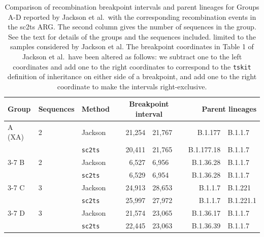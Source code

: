 \documentclass[12pt]{article}
\begin{document}
\begin{table}
\centering
\caption{
Comparison of recombination breakpoint
intervals and parent lineages for Groups A-D
reported by Jackson et al.\ with the corresponding
recombination events in the sc2ts ARG.
The second column gives the number of sequences in the group.
See the text for details of the groups and the sequences included.
limited to the samples considered by Jackson et al.
The breakpoint coordinates in Table 1 of Jackson et al.\ have been altered as follows:
we subtract one to the left coordinates and add one to the right coordinates
to correspond to the \texttt{tskit} definition of inheritance on either side of a breakpoint,
and add one to the right coordinate to make the intervals right-exclusive.
}
\label{tab:jackson}
\begin{tabular}{lllr@{--}lr@{+}l}
\toprule
Group & Sequences & Method & \multicolumn{2}{c}{Breakpoint interval} & \multicolumn{2}{r}{Parent lineages} \\
\midrule
A (XA)       & 2   & Jackson        &  21,254&21,767 & B.1.177&B.1.1.7 \\
             &     &\texttt{sc2ts} &  20,411&21,765 & B.1.177.18&B.1.1.7 \\
\cmidrule{3-7}
B            & 2   & Jackson        &  6,527&6,956 & B.1.36.28&B.1.1.7  \\
             &     &\texttt{sc2ts} &   6,529&6,954 & B.1.36.28&B.1.1.7  \\
\cmidrule{3-7}
C            & 3   &Jackson         &  24,913&28,653 &  B.1.1.7&B.1.221 \\
             &     &\texttt{sc2ts} &  25,997&27,972 &  B.1.1.7&B.1.221.1 \\
\cmidrule{3-7}
D            & 3   & Jackson        &  21,574&23,065 &  B.1.36.17&B.1.1.7 \\
             &     &\texttt{sc2ts} &  22,445&23,063 &  B.1.36.39&B.1.1.7 \\
\bottomrule
\end{tabular}
\end{table}
\end{document}
